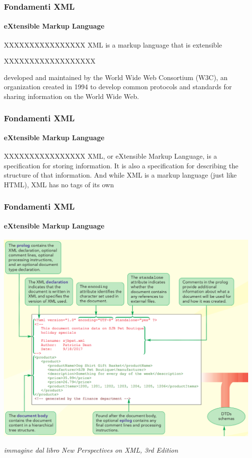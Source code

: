 \begin{frame}
	\frametitle{Fondamenti XML}
	\framesubtitle{eXtensible Markup Language}
	\addtocounter{nframe}{1}

	\begin{block}{XXXXXXXXXXXXXXXX}
		XML is a markup language that is extensible
	\end{block}

	\begin{block} {XXXXXXXXXXXXXXXXXX}

		developed and maintained by the World Wide Web Consortium (W3C),
		an organization created in 1994 to develop common protocols and standards for
		sharing information on the World Wide Web.

	\end{block}
\end{frame}

\begin{frame}
	\frametitle{Fondamenti XML}
	\framesubtitle{eXtensible Markup Language}
	\addtocounter{nframe}{1}

	\begin{block}{XXXXXXXXXXXXXXXX}
		XML, or eXtensible Markup Language, is a
		specification for storing information. It is also
		a specification for describing the structure of
		that information. And while XML is a markup
		language (just like HTML), XML has no tags
		of its own
	\end{block}

\end{frame}


\begin{frame}
	\frametitle{Fondamenti XML}
	\framesubtitle{eXtensible Markup Language}
	\addtocounter{nframe}{1}

	\begin{center}
		\includegraphics[width=.8\textwidth]{imgs/xml-intro-doc-xml.png}
	\end{center}

	\begin{tiny}\textit{immagine dal libro New Perspectives on XML, 3rd Edition}\end{tiny}

\end{frame}


